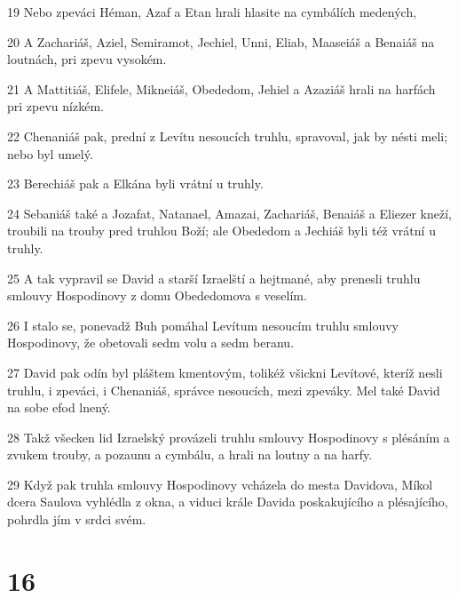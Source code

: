 \par 19 Nebo zpeváci Héman, Azaf a Etan hrali hlasite na cymbálích medených,
\par 20 A Zachariáš, Aziel, Semiramot, Jechiel, Unni, Eliab, Maaseiáš a Benaiáš na loutnách, pri zpevu vysokém.
\par 21 A Mattitiáš, Elifele, Mikneiáš, Obededom, Jehiel a Azaziáš hrali na harfách pri zpevu nízkém.
\par 22 Chenaniáš pak, prední z Levítu nesoucích truhlu, spravoval, jak by nésti meli; nebo byl umelý.
\par 23 Berechiáš pak a Elkána byli vrátní u truhly.
\par 24 Sebaniáš také a Jozafat, Natanael, Amazai, Zachariáš, Benaiáš a Eliezer kneží, troubili na trouby pred truhlou Boží; ale Obededom a Jechiáš byli též vrátní u truhly.
\par 25 A tak vypravil se David a starší Izraelští a hejtmané, aby prenesli truhlu smlouvy Hospodinovy z domu Obededomova s veselím.
\par 26 I stalo se, ponevadž Buh pomáhal Levítum nesoucím truhlu smlouvy Hospodinovy, že obetovali sedm volu a sedm beranu.
\par 27 David pak odín byl pláštem kmentovým, tolikéž všickni Levítové, kteríž nesli truhlu, i zpeváci, i Chenaniáš, správce nesoucích, mezi zpeváky. Mel také David na sobe efod lnený.
\par 28 Takž všecken lid Izraelský provázeli truhlu smlouvy Hospodinovy s plésáním a zvukem trouby, a pozaunu a cymbálu, a hrali na loutny a na harfy.
\par 29 Když pak truhla smlouvy Hospodinovy vcházela do mesta Davidova, Míkol dcera Saulova vyhlédla z okna, a viduci krále Davida poskakujícího a plésajícího, pohrdla jím v srdci svém.

\chapter{16}

